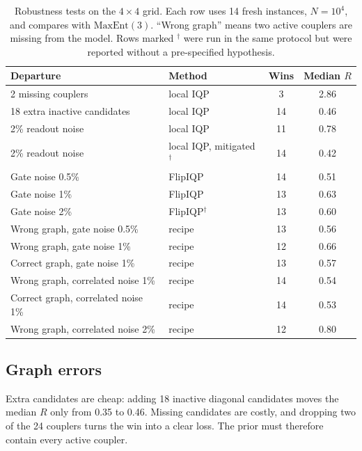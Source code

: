 \documentclass[aps,pra,twocolumn,superscriptaddress,nofootinbib]{revtex4-2}
\newcommand{\ME}{\mathrm{MaxEnt}(3)}
\begin{document}
\begin{table}[t]
\caption{Robustness tests on the $4\times4$ grid. Each row uses 14 fresh instances, $N=10^4$, and compares with
$\ME$. ``Wrong graph'' means two active couplers are missing from the model. Rows marked $^\dagger$ were run in the same
protocol but were reported without a pre-specified hypothesis.}
\label{tab:robust}
\begin{ruledtabular}
\begin{tabular}{llcc}
Departure & Method & Wins & Median $R$ \\
\hline
2 missing couplers & local IQP & 3 & 2.86 \\
18 extra inactive candidates & local IQP & 14 & 0.46 \\
2\% readout noise & local IQP & 11 & 0.78 \\
2\% readout noise & local IQP, mitigated$^\dagger$ & 14 & 0.42 \\
Gate noise 0.5\% & FlipIQP & 14 & 0.51 \\
Gate noise 1\% & FlipIQP & 13 & 0.63 \\
Gate noise 2\% & FlipIQP$^\dagger$ & 13 & 0.60 \\
Wrong graph, gate noise 0.5\% & recipe & 13 & 0.56 \\
Wrong graph, gate noise 1\% & recipe & 12 & 0.66 \\
Correct graph, gate noise 1\% & recipe & 13 & 0.57 \\
Wrong graph, correlated noise 1\% & recipe & 14 & 0.54 \\
Correct graph, correlated noise 1\% & recipe & 14 & 0.53 \\
Wrong graph, correlated noise 2\% & recipe & 12 & 0.80 \\
\end{tabular}
\end{ruledtabular}
\end{table}

\subsection{Graph errors}

Extra candidates are cheap: adding 18 inactive diagonal candidates moves the median $R$ only from 0.35 to 0.46.
Missing candidates are costly, and dropping two of the 24 couplers turns the win into a clear loss.
The prior must therefore contain every active coupler.
\end{document}
